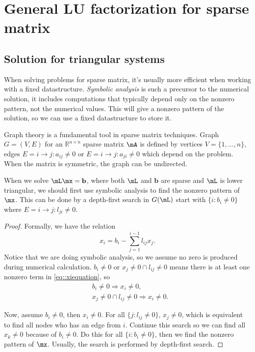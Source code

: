 \section{General LU factorization for sparse matrix}
\subsection{Solution for triangular systems}
\label{section::sparseLxb}
\begin{defn}
    When solving problems for sparse matrix, it's usually 
    more efficient when working with a fixed datastructure. 
    \textit{Symbolic analysis} is such a precursor to the 
    numerical solution, it includes computations that 
    typically depend only on the nonzero pattern, not the 
    numerical values. This will give a nonzero pattern of the 
    solution, so we can use a fixed datastructure to 
    store it.
\end{defn}

\begin{defn}
    Graph theory is a fundamental tool in sparse matrix 
    techniques. Graph $G=(V,E)$ for an $\mathbb{R}^{n\times n}$ 
    sparse matrix $\mA$ is defined by vertices $V=\{1,...,n\}$, 
    edges $E={i\rightarrow j:a_{ij}\neq 0}$ or 
    $E={i\rightarrow j:a_{ji}\neq 0}$ which depend on the 
    problem. When the matrix is symmetric, the graph can be 
    undirected. 
\end{defn}

\begin{lem}
    \label{lem::dfs}
    When we solve $\mL\mx=\mathbf{b}$, where both $\mL$ and 
    $\mathbf{b}$ are sparse and $\mL$ is lower triangular, 
    we should first use symbolic analysis to find the nonzero 
    pattern of $\mx$. This can be done by a depth-first search 
    in $G(\mL)$ start with $\{i:b_i\neq 0\}$ where 
    $E={i\rightarrow j:l_{ji}\neq 0}$. 
\end{lem}
\begin{proof}
    Formally, we have the relation
    \begin{equation}
        \label{eq::xiequation}
        x_i=b_i-\sum_{j=1}^{i-1}l_{ij}x_j.
    \end{equation}
    Notice that we are doing symbolic analysis, so we assume 
    no zero is produced during numerical calculation. 
    $b_i\neq 0$ or $x_j\neq 0\cap l_{ij}\neq 0$ means there is 
    at least one nonzero term in \eqref{eq::xiequation}, so 
    \begin{align*}
        &b_{i}\neq 0\Rightarrow x_i\neq 0,\\
        &x_j\neq 0\cap l_{ij}\neq 0\Rightarrow x_i\neq 0.
    \end{align*}

    Now, assume $b_i\neq 0$, then $x_i\neq 0$. For all 
    $\{j:l_{ij}\neq 0\}$, $x_j\neq 0$, which is equivalent to 
    find all nodes who has an edge from $i$. Continue this 
    search so we can find all $x_k\neq 0$ because of 
    $b_i\neq 0$. Do this for all $\{i:b_i\neq 0\}$, then we 
    find the nonzero pattern of $\mx$. Usually, the search is 
    performed by depth-first search.
\end{proof}


